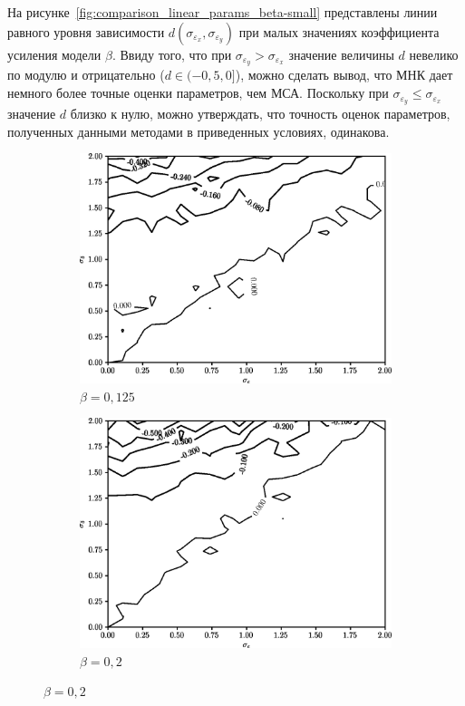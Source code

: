На рисунке~\ref{fig:comparison_linear_params_beta-small}
представлены линии равного уровня зависимости \( d(\sigma_{\varepsilon_x}, \sigma_{\varepsilon_y}) \)
при малых значениях коэффициента усиления модели \( \beta \).
Ввиду того, что при \( \sigma_{\varepsilon_y} > \sigma_{\varepsilon_x} \)
значение величины \( d \) невелико по модулю и отрицательно (\( d \in ( -0{,}5, 0 ] \)),
можно сделать вывод, что МНК дает немного более точные оценки параметров, чем МСА.
Поскольку при \( \sigma_{\varepsilon_y} \le \sigma_{\varepsilon_x} \) значение
\( d \) близко к нулю, можно утверждать, что точность оценок параметров,
полученных данными методами в приведенных условиях, одинакова.

\begin{figure}[p]
  \begin{subfigure}[b]{\linewidth}
    \centering
    \includegraphics[width=135mm]{fig/linear/param/beta-0,125_param.png}
    \caption{\( \beta = 0{,}125 \)}
  \end{subfigure}

  \vspace{2\baselineskip}
  \begin{subfigure}[b]{\linewidth}
    \centering
    \includegraphics[width=135mm]{fig/linear/param/beta-0,2_param.png}
    \caption{\( \beta = 0{,}2 \)}
  \end{subfigure}


\end{figure}
